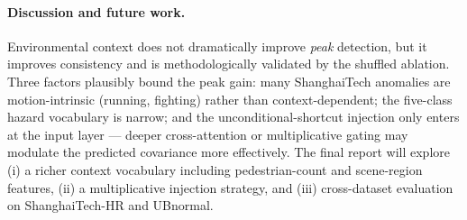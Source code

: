 \documentclass{article}
\begin{document}
\paragraph{Discussion and future work.}
Environmental context does not dramatically improve \emph{peak} detection,
but it improves consistency and is methodologically validated by the
shuffled ablation. Three factors plausibly bound the peak gain: many
ShanghaiTech anomalies are motion-intrinsic (running, fighting) rather
than context-dependent; the five-class hazard vocabulary is narrow; and
the unconditional-shortcut injection only enters at the input layer ---
deeper cross-attention or multiplicative gating may modulate the
predicted covariance more effectively. The final report will explore
(i) a richer context vocabulary including pedestrian-count and
scene-region features, (ii) a multiplicative injection strategy, and
(iii) cross-dataset evaluation on ShanghaiTech-HR and UBnormal.
\end{document}
